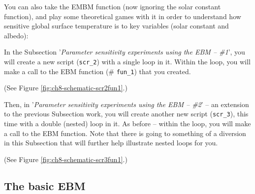 \documentclass{tufte-book} %
\begin{document}
You can also take the EMBM function (now ignoring the solar constant function), and play some theoretical games with it in order to understand how sensitive global surface temperature is to key variables (solar constant and albedo):

\begin{description}[align=right]

\setlength{\itemindent}{-0.2in}

\item [6.1.5] In the Subsection '\textit{Parameter sensitivity experiments using the EBM -- \#1}', you will create a new script (\texttt{scr\_2}) with a single loop in it. Within the loop, you will make a call to the EBM function (\# \texttt{fun\_1}) that you created.

\noindent (See Figure \ref{fig:ch8-schematic-scr2fun1}.)

\item [6.1.6] Then, in '\textit{Parameter sensitivity experiments using the EBM -- \#2}' -- an extension to the previous Subsection work, you will create another new script (\texttt{scr\_3}), this time  with a double (nested) loop in it. As before -- within the loop, you will make a call to the EBM function.
Note that there is going to something of a diversion in this Subsection that will further help illustrate nested loops for you.

\noindent (See Figure \ref{fig:ch8-schematic-scr3fun1}.)

\end{description}


\subsection{The basic EBM}
\end{document}
